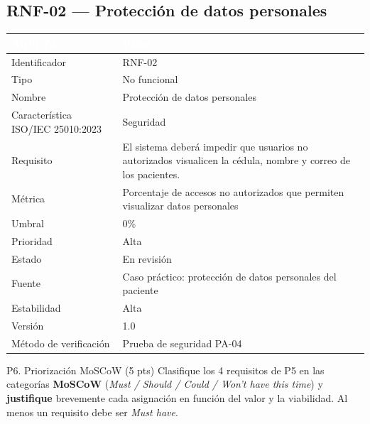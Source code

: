 \documentclass[11pt,a4paper,oneside]{article}
\newcommand{\hd}[1]{\cellcolor{darkblue}\textbf{\textcolor{white}{\small\sffamily #1}}}
\begin{document}
\subsection*{RNF-02 --- Protecci\'on de datos personales}
\begin{tabularx}{\linewidth}{@{}L{4.1cm} X@{}}
\toprule
\hd{Atributo} & \hd{Valor}\\
\midrule
Identificador & RNF-02\\
 Tipo & No funcional\\
Nombre & Protecci\'on de datos personales\\
 Caracter\'istica ISO/IEC 25010:2023 & Seguridad\\
Requisito & El sistema deber\'a impedir que usuarios no autorizados visualicen la c\'edula, nombre y correo de los pacientes.\\
 M\'etrica & Porcentaje de accesos no autorizados que permiten visualizar datos personales\\
Umbral & 0\%\\
 Prioridad & Alta\\
Estado & En revisi\'on\\
 Fuente & Caso pr\'actico: protecci\'on de datos personales del paciente\\
Estabilidad & Alta\\
 Versi\'on & 1.0\\
M\'etodo de verificaci\'on & Prueba de seguridad PA-04\\
\bottomrule
\end{tabularx}

\newpage


\begin{tarea}{P6. Priorizaci\'on MoSCoW \hfill (5 pts)}
Clasifique los 4 requisitos de P5 en las categor\'ias \textbf{MoSCoW} (\textit{Must / Should / Could / Won't have this time}) y \textbf{justifique} brevemente cada asignaci\'on en funci\'on del valor y la viabilidad. Al menos un requisito debe ser \textit{Must have}.
\end{tarea}
\end{document}
